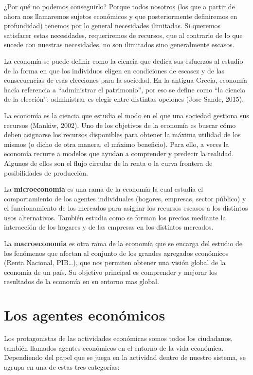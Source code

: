 \documentclass[
]{book}
\begin{document}
¿Por qué no podemos conseguirlo? Porque todos nosotros (los que a partir de ahora nos llamaremos sujetos económicos y que posteriormente definiremos en profundidad) tenemos por lo general necesidades ilimitadas. Si queremos satisfacer estas necesidades, requeriremos de recursos, que al contrario de lo que sucede con nuestras necesidades, no son ilimitados sino generalmente escasos.

La economía se puede definir como la ciencia que dedica sus esfuerzos al estudio de la forma en que los individuos eligen en condiciones de escasez y de las consecuencias de esas elecciones para la sociedad. En la antigua Grecia, economía hacía referencia a ``administrar el patrimonio'', por eso se define como ``la ciencia de la elección'': administrar es elegir entre distintas opciones (Jose Sande, 2015).

La economía es la ciencia que estudia el modo en el que una sociedad gestiona sus recursos (Mankiw, 2002). Uno de los objetivos de la economía es buscar cómo deben asignarse los recursos disponibles para obtener la máxima utilidad de los mismos (o dicho de otra manera, el máximo beneficio). Para ello, a veces la economía recurre a modelos que ayudan a comprender y predecir la realidad. Algunos de ellos son el flujo circular de la renta o la curva frontera de posibilidades de producción.

La \textbf{microeconomia} es una rama de la economía la cual estudia el comportamiento de los agentes individuales (hogares, empresas, sector público) y el funcionamiento de los mercados para asignar los recursos escasos a los distintos usos alternativos.
También estudia como se forman los precios mediante la interacción de los hogares y de las empresas en los distintos mercados.

La \textbf{macroeconomia} es otra rama de la economía que se encarga del estudio de los fenómenos que afectan al conjunto de los grandes agregados económicos (Renta Nacional, PIB\ldots), que nos permiten obtener una visión global de la economía de un país.
Su objetivo principal es comprender y mejorar los resultados de la economía en su entorno mas global.

\hypertarget{los-agentes-econuxf3micos}{%
\section{Los agentes económicos}\label{los-agentes-econuxf3micos}}

Los protagonistas de las actividades económicas somos todos los ciudadanos, también llamados agentes económicos en el entorno de la vida económica. Dependiendo del papel que se juega en la actividad dentro de nuestro sistema, se agrupa en una de estas tres categorías:
\end{document}
